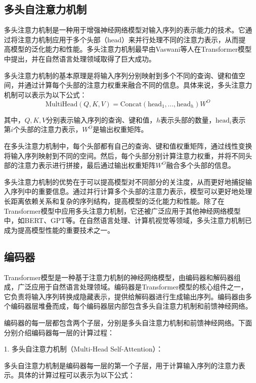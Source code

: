 \subsection{多头自注意力机制}
多头注意力机制是一种用于增强神经网络模型对输入序列的表示能力的技术。它通过将注意力机制应用于多个头部（head）来并行处理不同的注意力表示，从而提高模型的泛化能力和性能。多头注意力机制最早由Vaswani等人在Transformer模型中提出，并在自然语言处理领域取得了巨大成功。

多头注意力机制的基本原理是将输入序列分别映射到多个不同的查询、键和值空间，并通过计算每个头部的注意力权重来融合不同的信息。具体来说，多头注意力机制可以表示为以下公式：
\begin{equation}
	\text{MultiHead}(Q, K, V) = \text{Concat}(\text{head}_1, ..., \text{head}_h)W^O
\end{equation}



其中，$Q, K, V$分别表示输入序列的查询、键和值，$h$表示头部的数量，$\text{head}_i$表示第$i$个头部的注意力表示，$W^O$是输出权重矩阵。

在多头注意力机制中，每个头部都有自己的查询、键和值权重矩阵，通过线性变换将输入序列映射到不同的空间。然后，每个头部分别计算注意力权重，并将不同头部的注意力表示进行拼接，最后通过输出权重矩阵$W^O$融合多个头部的信息。

多头注意力机制的优势在于可以提高模型对不同部分的关注度，从而更好地捕捉输入序列中的重要信息。通过并行计算多个头部的注意力表示，模型可以更好地处理长距离依赖关系和复杂的序列结构，提高模型的泛化能力和性能。除了在Transformer模型中应用多头注意力机制，它还被广泛应用于其他神经网络模型中，如BERT、GPT等。在自然语言处理、计算机视觉等领域，多头注意力机制已成为提高模型性能的重要技术之一。
 
\subsection{编码器}
Transformer模型是一种基于注意力机制的神经网络模型，由编码器和解码器组成，广泛应用于自然语言处理领域。编码器是Transformer模型的核心组件之一，它负责将输入序列转换成隐藏表示，提供给解码器进行生成输出序列。编码器由多个编码器层堆叠而成，每个编码器层内部包含多头自注意力机制和前馈神经网络。

编码器的每一层都包含两个子层，分别是多头自注意力机制和前馈神经网络。下面分别介绍编码器每一层的计算过程：

1. 多头自注意力机制（Multi-Head Self-Attention）：

多头自注意力机制是编码器每一层的第一个子层，用于计算输入序列的注意力表示。具体的计算过程可以表示为以下公式：

